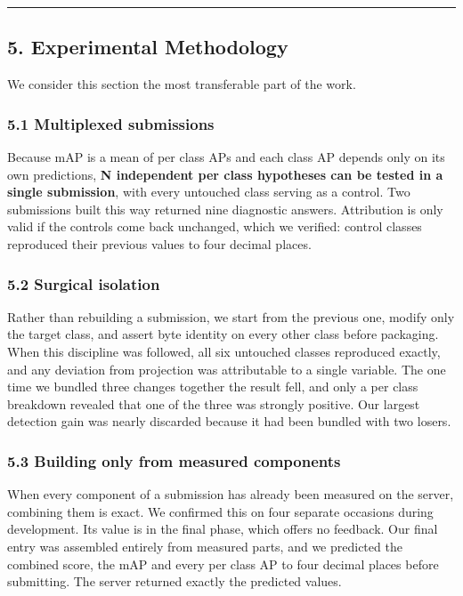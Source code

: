 \documentclass[
  10pt,
]{article}
\begin{document}
\begin{center}\rule{0.5\linewidth}{0.5pt}\end{center}

\subsection{5. Experimental Methodology}\label{experimental-methodology}

We consider this section the most transferable part of the work.

\subsubsection{5.1 Multiplexed
submissions}\label{multiplexed-submissions}

Because mAP is a mean of per class APs and each class AP depends only on
its own predictions, \textbf{N independent per class hypotheses can be
tested in a single submission}, with every untouched class serving as a
control. Two submissions built this way returned nine diagnostic
answers. Attribution is only valid if the controls come back unchanged,
which we verified: control classes reproduced their previous values to
four decimal places.

\subsubsection{5.2 Surgical isolation}\label{surgical-isolation}

Rather than rebuilding a submission, we start from the previous one,
modify only the target class, and assert byte identity on every other
class before packaging. When this discipline was followed, all six
untouched classes reproduced exactly, and any deviation from projection
was attributable to a single variable. The one time we bundled three
changes together the result fell, and only a per class breakdown
revealed that one of the three was strongly positive. Our largest
detection gain was nearly discarded because it had been bundled with two
losers.

\subsubsection{5.3 Building only from measured
components}\label{building-only-from-measured-components}

When every component of a submission has already been measured on the
server, combining them is exact. We confirmed this on four separate
occasions during development. Its value is in the final phase, which
offers no feedback. Our final entry was assembled entirely from measured
parts, and we predicted the combined score, the mAP and every per class
AP to four decimal places before submitting. The server returned exactly
the predicted values.
\end{document}
